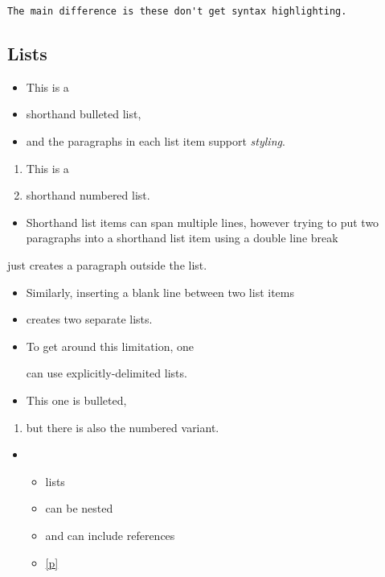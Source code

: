 \begin{verbatim}The main difference is these don't get syntax highlighting.\end{verbatim}%
\subsection{Lists\label{lists}}%
\begin{itemize}\item{This is a}%
\item{shorthand bulleted list,}%
\item{and the paragraphs in each list item support \emph{styling}.}\end{itemize}%
\begin{enumerate}\item{This is a}%
\item{shorthand numbered list.}\end{enumerate}%
\begin{itemize}\item{Shorthand list items can span multiple lines, however trying to put two paragraphs into a shorthand list item using a double line break}\end{itemize}%
\begin{flushleft}\end{flushleft}%
just creates a paragraph outside the list.

\begin{itemize}\item{Similarly, inserting a blank line between two list items}\end{itemize}%
\begin{itemize}\item{creates two separate lists.}\end{itemize}%
\begin{itemize}\item{\begin{flushleft}\end{flushleft}%
To get around this limitation, one

\begin{flushleft}\end{flushleft}%
can use explicitly-delimited lists.

}%
\item{This one is bulleted,}\end{itemize}%
\begin{enumerate}\item{but there is also the numbered variant.}\end{enumerate}%
\begin{itemize}\item{\begin{itemize}\item{lists}%
\item{can be nested}%
\item{and can include references}%
\item{\hyperref[container-page-test+u+package+++ml-module-Markup-val-foo]{[p\pageref*{container-page-test+u+package+++ml-module-Markup-val-foo}]}}\end{itemize}%
}\end{itemize}%
